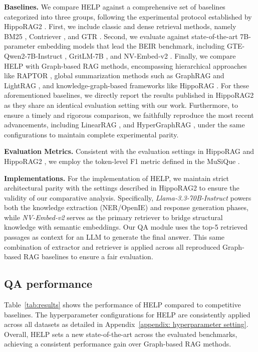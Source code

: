 \textbf{Baselines.} We compare HELP against a comprehensive set of baselines categorized into three groups, following the experimental protocol established by HippoRAG2 \cite{gutierrez2025rag}. First, we include classic and dense retrieval methods, namely BM25 \cite{robertson1994some}, Contriever \cite{izacard2021unsupervised}, and GTR \cite{ni2022large}. Second, we evaluate against state-of-the-art 7B-parameter embedding models that lead the BEIR benchmark\cite{thakur2021beir}, including GTE-Qwen2-7B-Instruct \cite{li2023towards}, GritLM-7B \cite{muennighoff2024generative}, and NV-Embed-v2 \cite{lee2024nv}. Finally, we compare HELP with Graph-based RAG methods, encompassing hierarchical approaches like RAPTOR \cite{sarthi2024raptor}, global summarization methods such as GraphRAG \cite{edge2024local} and LightRAG \cite{guo2024lightrag}, and knowledge-graph-based frameworks like HippoRAG \cite{jimenez2024hipporag}. For these aforementioned baselines, we directly report the results published in HippoRAG2 as they share an identical evaluation setting with our work. Furthermore, to ensure a timely and rigorous comparison, we faithfully reproduce the most recent advancements, including LinearRAG \cite{zhuang2025linearrag}, and HyperGraphRAG \cite{luo2025hypergraphrag}, under the same configurations to maintain complete experimental parity.

\textbf{Evaluation Metrics.} 
Consistent with the evaluation settings in HippoRAG \cite{jimenez2024hipporag} and HippoRAG2 \cite{gutierrez2025rag}, we employ the token-level F1 metric defined in the MuSiQue \cite{trivedi-etal-2022-musique}.

\textbf{Implementations.} For the implementation of HELP, we maintain strict architectural parity with the settings described in HippoRAG2 \cite{gutierrez2025rag} to ensure the validity of our comparative analysis. Specifically, \textit{Llama-3.3-70B-Instruct} \cite{llama3modelcard} powers both the knowledge extraction (NER/OpenIE) and response generation phases, while \textit{NV-Embed-v2} \cite{lee2024nv} serves as the primary retriever to bridge structural knowledge with semantic embeddings. Our QA module uses the top-5 retrieved passages as context for an LLM to generate the final answer. This same combination of extractor and retriever is applied across all reproduced Graph-based RAG baselines to ensure a fair evaluation.

\subsection{QA performance}
Table~\ref{tab:results} shows the performance of HELP compared to competitive baselines. The hyperparameter configurations for HELP are consistently applied across all datasets as detailed in Appendix~\ref{appendix: hyperparameter setting}. Overall, HELP sets a new state-of-the-art across the evaluated benchmarks, achieving a consistent performance gain over Graph-based RAG methods.

